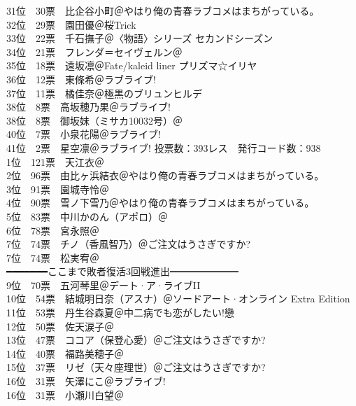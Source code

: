 {    31位　30票　比企谷小町＠やはり俺の青春ラブコメはまちがっている。\\
    32位　29票　園田優＠桜Trick\\
    33位　22票　千石撫子＠〈物語〉シリーズ セカンドシーズン\\
    34位　21票　フレンダ＝セイヴェルン＠\Railgan\\
    35位　18票　遠坂凛＠Fate/kaleid liner プリズマ☆イリヤ\\
    36位　12票　東條希＠ラブライブ!\\
    37位　11票　橘佳奈＠極黒のブリュンヒルデ\\
    38位　8票　高坂穂乃果＠ラブライブ!\\
    38位　8票　御坂妹（ミサカ10032号）＠\Railgan\\
    40位　7票　小泉花陽＠ラブライブ!\\
    41位　2票　星空凛＠ラブライブ!
}{
    投票数：393レス　発行コード数：938\\
    1位　121票　天江衣＠\Saki\\
    2位　96票　由比ヶ浜結衣＠やはり俺の青春ラブコメはまちがっている。\\
    3位　91票　園城寺怜＠\Saki\\
    4位　90票　雪ノ下雪乃＠やはり俺の青春ラブコメはまちがっている。\\
    5位　83票　中川かのん（アポロ）＠\Kaminomi\\
    6位　78票　宮永照＠\Saki\\
    7位　74票　チノ（香風智乃）＠ご注文はうさぎですか?\\
    7位　74票　松実宥＠\Saki\\
    ━━━━━━━ここまで敗者復活3回戦進出━━━━━━━\\
    9位　70票　五河琴里＠デート·ア·ライブII\\
    10位　54票　結城明日奈（アスナ）＠ソードアート·オンライン Extra Edition\\
    11位　53票　丹生谷森夏＠中二病でも恋がしたい!戀\\
    12位　50票　佐天涙子＠\Railgan\\
    13位　47票　ココア（保登心愛）＠ご注文はうさぎですか?\\
    14位　40票　福路美穂子＠\Saki\\
    15位　37票　リゼ（天々座理世）＠ご注文はうさぎですか?\\
    16位　31票　矢澤にこ＠ラブライブ!\\
    16位　31票　小瀬川白望＠\Saki\\
}
